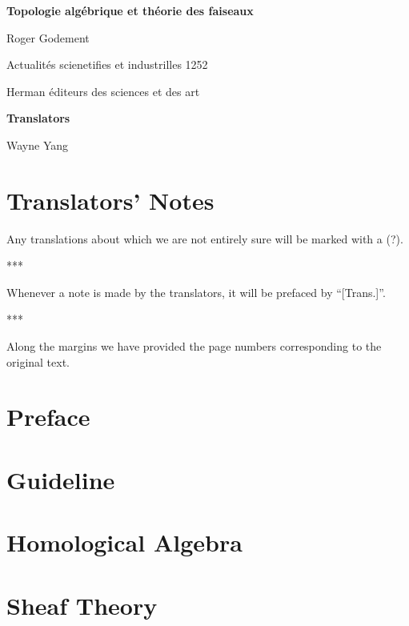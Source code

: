 \documentclass[openany,oneside]{amsbook}
\theoremstyle{ega-env-style}
\theoremstyle{ega-thm-env-style}
\theoremstyle{ega-defn-env-style}
\def\unsure#1{#1 {\color{red}(?)}}
\def\sectionbreak{\begin{center}***\end{center}}
\begin{document}
\begin{titlepage}
\pagestyle{empty}
\setcounter{page}{1}
\centerline{\LARGE\bfseries Topologie alg\'ebrique et th\'eorie des faiseaux}
\vskip0.5in
\noindent
\centerline{Roger Godement}
\centerline{Actualit\'es scienetifies et industrilles 1252}
\centerline{Herman \'editeurs des sciences et des art}
\vskip0.5in
\noindent
\centerline{\bfseries Translators}
\centerline{Wayne Yang}
\end{titlepage}
\setcounter{tocdepth}{2}
\tableofcontents

\label{section:Trasnote}
\chapter*{Translators' Notes}

\unsure{Any translations about which we are not entirely sure will be marked with a}.

\sectionbreak

Whenever a note is made by the translators, it will be prefaced by ``[Trans.]''.

\sectionbreak

Along the margins we have provided the page numbers corresponding to the original text.

\chapter*{Preface}

\label{section:preface}


\chapter*{Guideline}

\label{section:guideline}


\chapter{Homological Algebra}

\label{section:tatf1}


\chapter{Sheaf Theory}

\label{section:tatf2}




\end{document}

